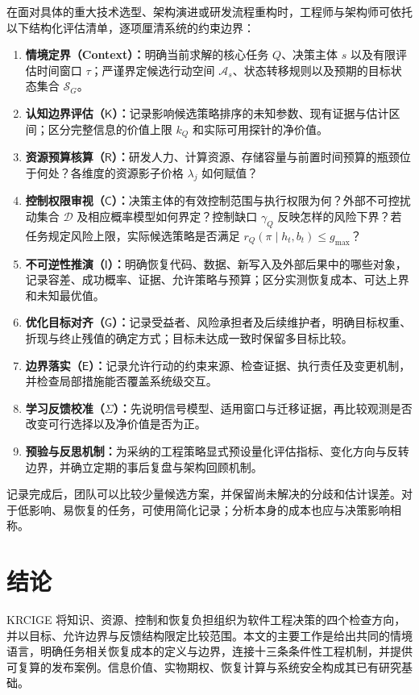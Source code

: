 \documentclass[11pt,a4paper]{ctexart}
\numberwithin{equation}{section}
\theoremstyle{definition}
\theoremstyle{plain}
\newcommand{\Know}{\mathsf{K}}
\newcommand{\Res}{\mathsf{R}}
\newcommand{\Ctrl}{\mathsf{C}}
\newcommand{\Info}{\mathsf{I}}
\newcommand{\Goal}{\mathsf{G}}
\newcommand{\Eth}{\mathsf{E}}
\newcommand{\Learn}{\Sigma}
\begin{document}
在面对具体的重大技术选型、架构演进或研发流程重构时，工程师与架构师可依托以下结构化评估清单，逐项厘清系统的约束边界：
\begin{enumerate}
    \item \textbf{情境定界（Context）：}明确当前求解的核心任务 $Q$、决策主体 $s$ 以及有限评估时间窗口 $\tau$；严谨界定候选行动空间 $\mathcal{A}_s$、状态转移规则以及预期的目标状态集合 $\mathcal{S}_G$。
    \item \textbf{认知边界评估（$\Know$）：}记录影响候选策略排序的未知参数、现有证据与估计区间；区分完整信息的价值上限 $k_Q$ 和实际可用探针的净价值。
    \item \textbf{资源预算核算（$\Res$）：}研发人力、计算资源、存储容量与前置时间预算的瓶颈位于何处？各维度的资源影子价格 $\lambda_j$ 如何赋值？
    \item \textbf{控制权限审视（$\Ctrl$）：}决策主体的有效控制范围与执行权限为何？外部不可控扰动集合 $\mathcal{D}$ 及相应概率模型如何界定？控制缺口 $\gamma_Q$ 反映怎样的风险下界？若任务规定风险上限，实际候选策略是否满足 $r_Q(\pi\mid h_t,b_t)\le g_{\max}$？
    \item \textbf{不可逆性推演（$\Info$）：}明确恢复代码、数据、新写入及外部后果中的哪些对象，记录容差、成功概率、证据、允许策略与预算；区分实测恢复成本、可达上界和未知最优值。
    \item \textbf{优化目标对齐（$\Goal$）：}记录受益者、风险承担者及后续维护者，明确目标权重、折现与终止残值的确定方式；目标未达成一致时保留多目标比较。
    \item \textbf{边界落实（$\Eth$）：}记录允许行动的约束来源、检查证据、执行责任及变更机制，并检查局部措施能否覆盖系统级交互。
    \item \textbf{学习反馈校准（$\Learn$）：}先说明信号模型、适用窗口与迁移证据，再比较观测是否改变可行选择以及净价值是否为正。
    \item \textbf{预验与反思机制：}为采纳的工程策略显式预设量化评估指标、变化方向与反转边界，并确立定期的事后复盘与架构回顾机制。
\end{enumerate}

记录完成后，团队可以比较少量候选方案，并保留尚未解决的分歧和估计误差。对于低影响、易恢复的任务，可使用简化记录；分析本身的成本也应与决策影响相称。

\section{结论}

KRCIGE 将知识、资源、控制和恢复负担组织为软件工程决策的四个检查方向，并以目标、允许边界与反馈结构限定比较范围。本文的主要工作是给出共同的情境语言，明确任务相关恢复成本的定义与边界，连接十三条条件性工程机制，并提供可复算的发布案例。信息价值、实物期权、恢复计算与系统安全构成其已有研究基础。
\end{document}
